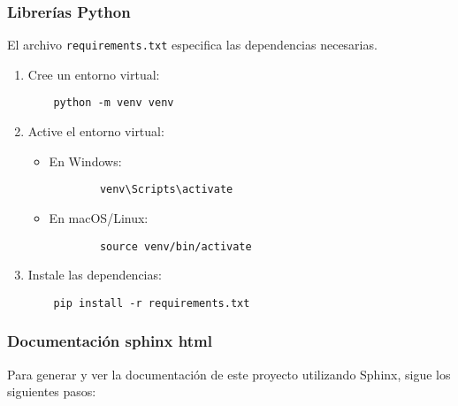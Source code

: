 \subsubsection{Librerías Python}
El archivo \texttt{requirements.txt} especifica las dependencias necesarias.

\begin{enumerate}
    \item Cree un entorno virtual:
    \begin{verbatim}
    python -m venv venv
    \end{verbatim}
    \item Active el entorno virtual:
    \begin{itemize}
        \item En Windows:
        \begin{verbatim}
        venv\Scripts\activate
        \end{verbatim}
        \item En macOS/Linux:
        \begin{verbatim}
        source venv/bin/activate
        \end{verbatim}
    \end{itemize}
    \item Instale las dependencias:
    \begin{verbatim}
    pip install -r requirements.txt
    \end{verbatim}
\end{enumerate}

\subsubsection{Documentación sphinx html}

Para generar y ver la documentación de este proyecto utilizando Sphinx, sigue los siguientes pasos:

